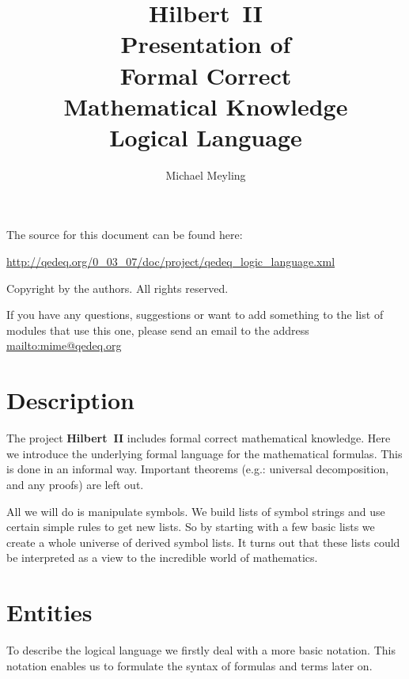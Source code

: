 \documentclass[a4paper,german,10pt,twoside]{book}
\title{\textbf{Hilbert~II} \\
\vspace*{1cm} 
Presentation of \\ 
Formal Correct \\
Mathematical Knowledge \\
\vspace*{1cm} Logical Language}
\author{
Michael Meyling
}
\theoremstyle{definition}
\theoremstyle{remark}
\begin{document}
\maketitle

\setlength{\parskip}{5pt plus 2pt minus 1pt}
\mbox{}
\vfill

\par
The source for this document can be found here:
\par
\url{http://qedeq.org/0_03_07/doc/project/qedeq_logic_language.xml}

\par
Copyright by the authors. All rights reserved.
\par
If you have any questions, suggestions or want to add something to the list of modules that use this one, please send an email to the address \url{mailto:mime@qedeq.org}

\setlength{\parskip}{0pt}
\tableofcontents

\setlength{\parskip}{5pt plus 2pt minus 1pt}

\chapter*{Description} \label{chapter0} \hypertarget{chapter0}{}

The project \textbf{Hilbert~II} includes formal correct mathematical knowledge. Here we introduce the underlying formal language for the mathematical formulas. This is done in an informal way. Important theorems (e.g.: universal decomposition, and any proofs) are left out.

\par
All we will do is manipulate symbols. We build lists of symbol strings and use certain simple rules to get new lists. So by starting with a few basic lists we create a whole universe of derived symbol lists. 
It turns out that these lists could be interpreted as a view to the incredible world of mathematics.


\chapter{Entities} \label{chapter1} \hypertarget{chapter1}{}

To describe the logical language we firstly deal with a more basic notation. This notation enables us to formulate the syntax of formulas and terms later on.
\end{document}
